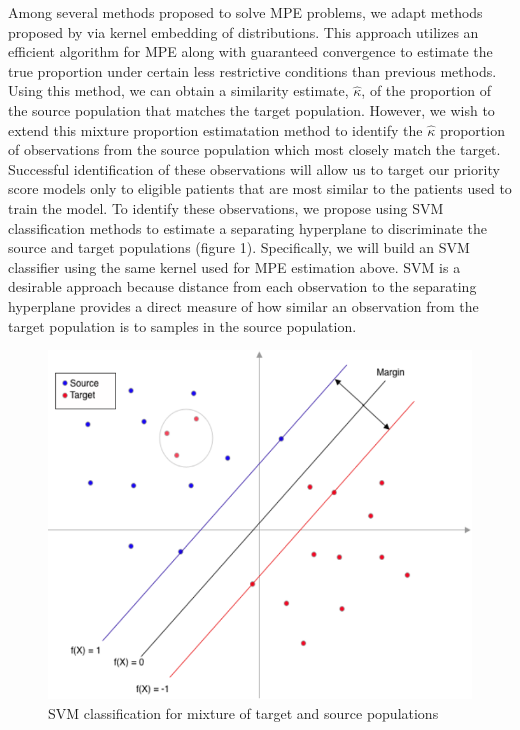 \documentclass[lineno]{biometrika}
\begin{document}
Among several methods proposed to solve MPE problems, we adapt methods proposed by \citet{Ramaswamy:2016} via kernel embedding of distributions. This approach utilizes an efficient algorithm for MPE along with guaranteed convergence to estimate the true proportion under certain less restrictive conditions than previous methods. Using this method, we can obtain a similarity estimate, $\hat{\kappa}$, of the proportion of the source population that matches the target population. However, we wish to extend this mixture proportion estimatation method to identify the $\hat{\kappa}$ proportion of observations from the source population which most closely match the target. Successful identification of these observations will allow us to target our priority score models only to eligible patients that are most similar to the patients used to train the model.  To identify these observations, we propose using SVM classification methods to estimate a separating hyperplane to discriminate the source and target populations (figure 1). Specifically, we will build an SVM classifier using the same kernel used for MPE estimation above. SVM is a desirable approach because distance from each observation to the separating hyperplane provides a direct measure of how similar an observation from the target population is to samples in the source population. 

\begin{figure}[h]
\begin{center}
\includegraphics[width=0.65\linewidth, height=0.6\linewidth]{art/svm.png}
\caption{SVM classification for mixture of target and source populations}
\label{fig1}
\end{center}
\end{figure}
\end{document}
